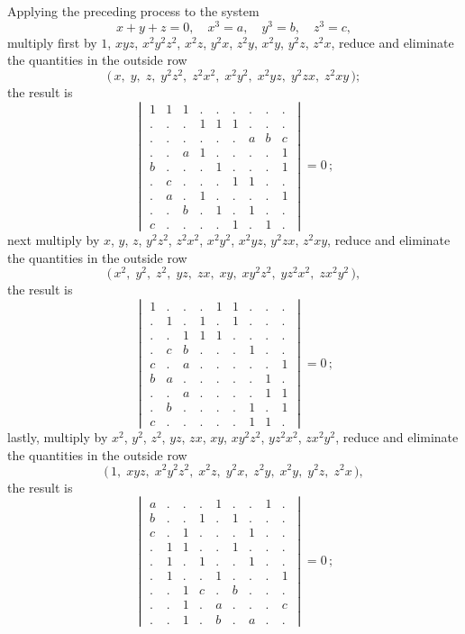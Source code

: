 \documentclass[11pt,a4paper]{article}
\theoremstyle{plain}
\begin{document}
Applying the preceding process to the system
\[x + y + z = 0, \quad x^3 = a, \quad y^3 = b, \quad z^3 = c,\]
multiply first by $1$, $xyz$, $x^2 y^2 z^2$, $x^2 z$, $y^2 x$, $z^2 y$, $x^2 y$, $y^2 z$, $z^2 x$, reduce and eliminate the quantities in the outside row
\[\bigl(\, x,\; y,\; z,\; y^2 z^2,\; z^2 x^2,\; x^2 y^2,\; x^2 yz,\; y^2 zx,\; z^2 xy\,\bigr);\]
the result is
\[\begin{vmatrix}
1 & 1 & 1 & . & . & . & . & . & . \\
. & . & . & 1 & 1 & 1 & . & . & . \\
. & . & . & . & . & . & a & b & c \\
. & . & a & 1 & . & . & . & . & 1 \\
b & . & . & . & 1 & . & . & . & 1 \\
. & c & . & . & . & 1 & 1 & . & . \\
. & a & . & 1 & . & . & . & . & 1 \\
. & . & b & . & 1 & . & 1 & . & . \\
c & . & . & . & . & 1 & . & 1 & .
\end{vmatrix} = 0\,;\]
next multiply by $x$, $y$, $z$, $y^2 z^2$, $z^2 x^2$, $x^2 y^2$, $x^2 y z$, $y^2 z x$, $z^2 x y$, reduce and eliminate the quantities in the outside row
\[\bigl(\, x^2,\; y^2,\; z^2,\; yz,\; zx,\; xy,\; xy^2 z^2,\; y z^2 x^2,\; z x^2 y^2\,\bigr),\]
the result is
\[\begin{vmatrix}
1 & . & . & . & 1 & 1 & . & . & . \\
. & 1 & . & 1 & . & 1 & . & . & . \\
. & . & 1 & 1 & 1 & . & . & . & . \\
. & c & b & . & . & . & 1 & . & . \\
c & . & a & . & . & . & . & . & 1 \\
b & a & . & . & . & . & . & 1 & . \\
. & . & a & . & . & . & . & 1 & 1 \\
. & b & . & . & . & . & 1 & . & 1 \\
c & . & . & . & . & . & 1 & 1 & .
\end{vmatrix} = 0\,;\]
lastly, multiply by $x^2$, $y^2$, $z^2$, $yz$, $zx$, $xy$, $x y^2 z^2$, $y z^2 x^2$, $z x^2 y^2$, reduce and eliminate the quantities in the outside row
\[\bigl(\, 1,\; xyz,\; x^2 y^2 z^2,\; x^2 z,\; y^2 x,\; z^2 y,\; x^2 y,\; y^2 z,\; z^2 x\,\bigr),\]
the result is
\[\begin{vmatrix}
a & . & . & . & 1 & . & . & 1 & . \\
b & . & . & 1 & . & 1 & . & . & . \\
c & . & 1 & . & . & . & 1 & . & . \\
. & 1 & 1 & . & . & 1 & . & . & . \\
. & 1 & . & 1 & . & . & 1 & . & . \\
. & 1 & . & . & 1 & . & . & . & 1 \\
. & . & 1 & c & . & b & . & . & . \\
. & . & 1 & . & a & . & . & . & c \\
. & . & 1 & . & b & . & a & . & .
\end{vmatrix} = 0\,;\]
\end{document}
